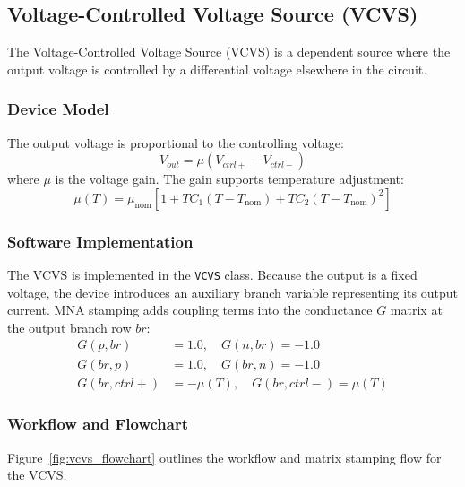 \subsection{Voltage-Controlled Voltage Source (VCVS)}
The Voltage-Controlled Voltage Source (VCVS) is a dependent source where the output voltage is controlled by a differential voltage elsewhere in the circuit.

\subsubsection{Device Model}
The output voltage is proportional to the controlling voltage:
\begin{equation}
    V_{out} = \mu \left( V_{ctrl+} - V_{ctrl-} \right)
\end{equation}
where $\mu$ is the voltage gain. The gain supports temperature adjustment:
\begin{equation}
    \mu(T) = \mu_{\text{nom}} \left[ 1 + TC_1 (T - T_{\text{nom}}) + TC_2 (T - T_{\text{nom}})^2 \right]
\end{equation}

\subsubsection{Software Implementation}
The VCVS is implemented in the \texttt{VCVS} class. Because the output is a fixed voltage, the device introduces an auxiliary branch variable representing its output current. 
MNA stamping adds coupling terms into the conductance $G$ matrix at the output branch row $br$:
\begin{align}
    G(p, br) &= 1.0, \quad G(n, br) = -1.0 \\
    G(br, p) &= 1.0, \quad G(br, n) = -1.0 \\
    G(br, ctrl+) &= -\mu(T), \quad G(br, ctrl-) = \mu(T)
\end{align}

\subsubsection{Workflow and Flowchart}
Figure~\ref{fig:vcvs_flowchart} outlines the workflow and matrix stamping flow for the VCVS.

